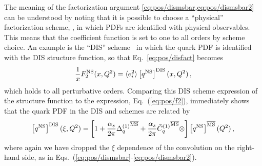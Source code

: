 The  meaning of the factorization argument
\cref{eq:pos/dismsbar,eq:pos/dismsbar2} can be understood by noting that it is
possible to choose a \enquote{physical} factorization scheme,
\cite{Catani:1995ze}, in which PDFs are identified with physical observables.
This means that the coefficient function is set to one to all orders by scheme
choice.
An example is the ``DIS'' scheme~\cite{Diemoz:1987xu} in which the quark PDF is
identified with the DIS structure function, so that Eq.~\ref{eq:pos/disfact}
becomes
\begin{equation}\label{eq:pos/disfactns}
 \frac{1}{x} F_2^{{\textrm{NS}}}(x,Q^2)= \langle e_i^2\rangle  \left[{q^{{\textrm{NS}}}}\right]^{\textrm{DIS}}(x,Q^2) \,,
 \end{equation}
which holds to all perturbative orders. Comparing this DIS scheme
expression of the structure function to the \msbar{} expression,
Eq.~(\ref{eq:pos/f2}), immediately shows that the quark PDF in the DIS
and \msbar{} schemes are related by
\begin{equation}\label{eq:pos/msbartodis}
\left[{q^{{\textrm{NS}}}}\right]^{\textrm{DIS}}(\xi,Q^2)=
\left[1+\frac{\alpha_s}{2\pi} {\Delta^{(1)}_q}^{{\overline{\textrm{MS}}}}
  +\frac{\alpha_s}{2\pi}
  {{{\bar{C}}^{(1)}}_q{}}^{{\overline{\textrm{MS}}}}\otimes\right]\left[{q^{{\textrm{NS}}}}\right]^{{\overline{\textrm{MS}}}}(Q^2) \,,
\end{equation}
where again we have dropped the $\xi$ dependence of the convolution
on the right-hand side,
as in Eqs.~(\ref{eq:pos/dismsbar}-\ref{eq:pos/dismsbar2}).

